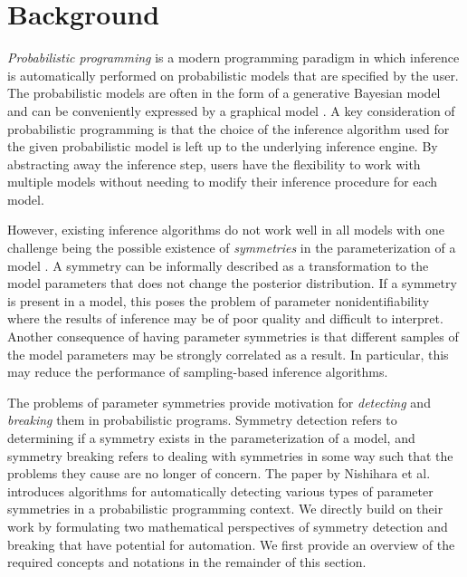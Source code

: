 

\section{Background}

\textit{Probabilistic programming} is a modern programming paradigm in which inference is automatically performed on probabilistic models that are specified by the user. The probabilistic models are often in the form of a generative Bayesian model and can be conveniently expressed by a graphical model \cite{Rainforth:2017}. A key consideration of probabilistic programming is that the choice of the inference algorithm used for the given probabilistic model is left up to the underlying inference engine. By abstracting away the inference step, users have the flexibility to work with multiple models without needing to modify their inference procedure for each model.

However, existing inference algorithms do not work well in all models with one challenge being the possible existence of \textit{symmetries} in the parameterization of a model \cite{Nishihara:2013}. A symmetry can be informally described as a transformation to the model parameters that does not change the posterior distribution. If a symmetry is present in a model, this poses the problem of parameter nonidentifiability where the results of inference may be of poor quality and difficult to interpret. Another consequence of having parameter symmetries is that different samples of the model parameters may be strongly correlated as a result. In particular, this may reduce the performance of sampling-based inference algorithms.

The problems of parameter symmetries provide motivation for \textit{detecting} and \textit{breaking} them in probabilistic programs. Symmetry detection refers to determining if a symmetry exists in the parameterization of a model, and symmetry breaking refers to dealing with symmetries in some way such that the problems they cause are no longer of concern. The paper by Nishihara et al. \cite{Nishihara:2013} introduces algorithms for automatically detecting various types of parameter symmetries in a probabilistic programming context. We directly build on their work by formulating two mathematical perspectives of symmetry detection and breaking that have potential for automation. We first provide an overview of the required concepts and notations in the remainder of this section.


